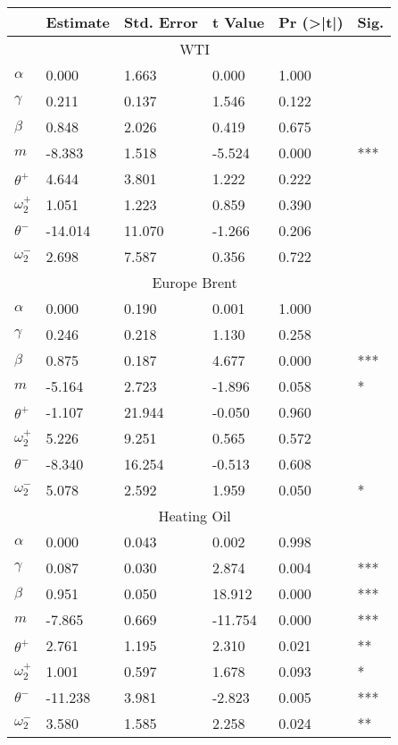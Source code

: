 \begin{paracol}{2}
\begin{table}
\begin{threeparttable}
        \begin{tabularx}{\textwidth}{l *{5}{X}}
            \toprule
            & \textbf{Estimate} & \textbf{Std. Error} & \textbf{t Value} & \textbf{Pr (>|t|)} & \textbf{Sig.} \\
            \midrule
            & \multicolumn{4}{c}{WTI} & \\
            $\alpha$ & 0.000 & 1.663 & 0.000 & 1.000 & \\
            $\gamma$ & 0.211 & 0.137 & 1.546 & 0.122 & \\
            $\beta$ & 0.848 & 2.026 & 0.419 & 0.675 & \\
            $m$ & -8.383 & 1.518 & -5.524 & 0.000 & *** \\
            $\theta^+$ & 4.644 & 3.801 & 1.222 & 0.222 & \\
            $\omega_2^+$ & 1.051 & 1.223 & 0.859 & 0.390 & \\
            $\theta^-$ & -14.014 & 11.070 & -1.266 & 0.206 & \\
            $\omega_2^-$ & 2.698 & 7.587 & 0.356 & 0.722 & \\
            \midrule
            & \multicolumn{4}{c}{Europe Brent} & \\
            $\alpha$ & 0.000 & 0.190 & 0.001 & 1.000 & \\
            $\gamma$ & 0.246 & 0.218 & 1.130 & 0.258 & \\
            $\beta$ & 0.875 & 0.187 & 4.677 & 0.000 & *** \\
            $m$ & -5.164 & 2.723 & -1.896 & 0.058 & * \\
            $\theta^+$ & -1.107 & 21.944 & -0.050 & 0.960 & \\
            $\omega_2^+$ & 5.226 & 9.251 & 0.565 & 0.572 & \\
            $\theta^-$ & -8.340 & 16.254 & -0.513 & 0.608 & \\
            $\omega_2^-$ & 5.078 & 2.592 & 1.959 & 0.050 & * \\
            \midrule
            & \multicolumn{4}{c}{Heating Oil} & \\
            $\alpha$ & 0.000 & 0.043 & 0.002 & 0.998 & \\
            $\gamma$ & 0.087 & 0.030 & 2.874 & 0.004 & *** \\
            $\beta$ & 0.951 & 0.050 & 18.912 & 0.000 & *** \\
            $m$ & -7.865 & 0.669 & -11.754 & 0.000 & *** \\
            $\theta^+$ & 2.761 & 1.195 & 2.310 & 0.021 & ** \\
            $\omega_2^+$ & 1.001 & 0.597 & 1.678 & 0.093 & * \\
            $\theta^-$ & -11.238 & 3.981 & -2.823 & 0.005 & *** \\
            $\omega_2^-$ & 3.580 & 1.585 & 2.258 & 0.024 & ** \\
            \bottomrule
        \end{tabularx}
        

\end{threeparttable}
\end{table}
\end{paracol}
